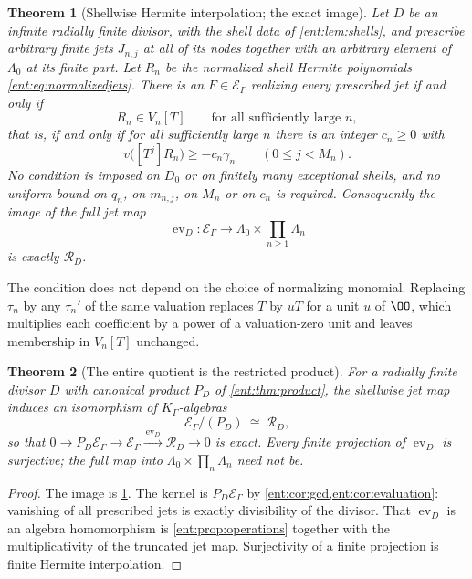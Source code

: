 \documentclass[11pt]{article}
\newtheorem{theorem}{Theorem}[section]
\theoremstyle{plain}
\theoremstyle{plain}
\theoremstyle{plain}
\theoremstyle{definition}
\theoremstyle{definition}
\theoremstyle{definition}
\theoremstyle{definition}
\theoremstyle{remark}
\newcommand{\K}{K_\Gamma}\newcommand{\KD}{K_\Delta}
\newcommand{\E}{\mathcal E_\Gamma}
\DeclareMathOperator{\ev}{ev}
\newcommand{\RD}{\mathcal R_D}\newcommand{\Ucal}{\mathcal U}
\begin{document}
\begin{theorem}[Shellwise Hermite interpolation; the exact image]
\label{ent:thm:image}
Let $D$ be an infinite radially finite divisor, with the shell data of
\cref{ent:lem:shells}, and prescribe arbitrary finite jets $J_{n,j}$ at all of
its nodes together with an arbitrary element of $\Lambda_0$ at its finite
part. Let $R_n$ be the normalized shell Hermite polynomials
\eqref{ent:eq:normalizedjets}. There is an $F\in\E$ realizing every
prescribed jet if and only if
\begin{equation}\label{ent:eq:maincondition}
 R_n\in V_n[T]\qquad\text{for all sufficiently large }n,
\end{equation}
that is, if and only if for all sufficiently large $n$ there is an integer
$c_n\ge0$ with
\[
 v\bigl([T^j]R_n\bigr)\ge-c_n\gamma_n\qquad(0\le j<M_n).
\]
No condition is imposed on $D_0$ or on finitely many exceptional shells, and
no uniform bound on $q_n$, on $m_{n,j}$, on $M_n$ or on $c_n$ is required.
Consequently the image of the full jet map
\[
 \ev_D:\E\longrightarrow
 \Lambda_0\times\prod_{n\ge1}\Lambda_n
\]
is exactly $\RD$.
\end{theorem}

The condition does not depend on the choice of normalizing monomial.
Replacing $\tau_n$ by any $\tau_n'$ of the same valuation replaces $T$ by
$uT$ for a unit $u$ of $\OO$, which multiplies each coefficient by a power of
a valuation-zero unit and leaves membership in $V_n[T]$ unchanged.

\begin{theorem}[The entire quotient is the restricted product]
\label{ent:thm:quotient}
For a radially finite divisor $D$ with canonical product $P_D$ of
\cref{ent:thm:product}, the shellwise jet map induces an isomorphism of
$\K$-algebras
\[
 \E/(P_D)\ \cong\ \RD,
\]
so that
$0\to P_D\E\to\E\xrightarrow{\ \ev_D\ }\RD\to0$
is exact. Every finite projection of $\ev_D$ is surjective; the full map into
$\Lambda_0\times\prod_n\Lambda_n$ need not be.
\end{theorem}
\begin{proof}
The image is \cref{ent:thm:image}. The kernel is $P_D\E$ by
\cref{ent:cor:gcd,ent:cor:evaluation}: vanishing of all prescribed jets is
exactly divisibility of the divisor. That $\ev_D$ is an algebra homomorphism
is \cref{ent:prop:operations} together with the multiplicativity of the
truncated jet map. Surjectivity of a finite projection is finite Hermite
interpolation.
\end{proof}
\end{document}

